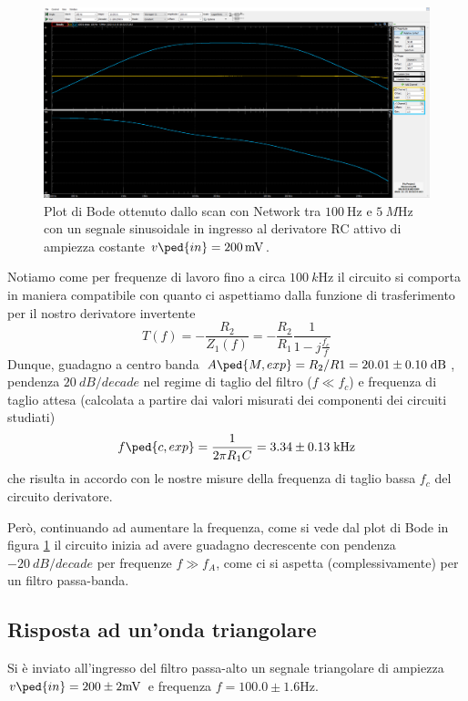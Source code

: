 \documentclass[10pt,a4paper]{article}
\begin{document}
\begin{figure}[htbp]
\centering
\includegraphics[scale=0.335]{hpfbode}
\caption{Plot di Bode ottenuto dallo scan con Network tra $\SI{100}{\Hz}$ e
$\SI{5}{M\Hz}$ con un segnale sinusoidale in ingresso al derivatore RC attivo
di ampiezza costante $v\ped{in} = \SI{200}{m\V}$.
\label{fig: derbode}}
\end{figure}

Notiamo come per frequenze di lavoro fino a circa $\SI{100}{k\Hz}$ il circuito si
comporta in maniera compatibile con quanto ci aspettiamo dalla funzione di
trasferimento per il nostro derivatore invertente
\begin{equation}\label{eq: hpfTfunc}
T(f) = - \frac{R_2}{Z_1(f)} = - \frac{R_2}{R_1} \frac{1}{1 - j \frac{f_c}{f}}
\end{equation}
Dunque, guadagno a centro banda
$A\ped{M, exp} = R_2/R1 = 20.01 \pm 0.10 \; \si{dB}$, pendenza
$\SI{20}{dB/decade}$ nel regime di taglio del filtro ($f \ll f_c$)
e frequenza di taglio attesa (calcolata a partire dai valori misurati dei
componenti dei circuiti studiati)
\begin{equation}\label{eq: hpfcut}
f\ped{c, exp} = \frac{1}{2\pi R_1 C} = 3.34 \pm 0.13 \; \si{k\Hz}
\end{equation}
che risulta in accordo con le nostre misure della frequenza di taglio
bassa $f_c$ del circuito derivatore.

Però, continuando ad aumentare la frequenza, come si vede dal plot di Bode in
figura \ref{fig: derbode} il circuito inizia ad avere guadagno decrescente con
pendenza $\SI{-20}{dB/decade}$ per frequenze $f \gg f_A$, come ci si aspetta
(complessivamente) per un filtro passa-banda.
 
\subsection{Risposta ad un'onda triangolare}
Si è inviato all'ingresso del filtro passa-alto un segnale triangolare di
ampiezza $v\ped{in} = 200 \pm 2 \si{m\V}$ e frequenza
$f = 100.0 \pm 1.6 \si{\Hz}$.
\end{document}
